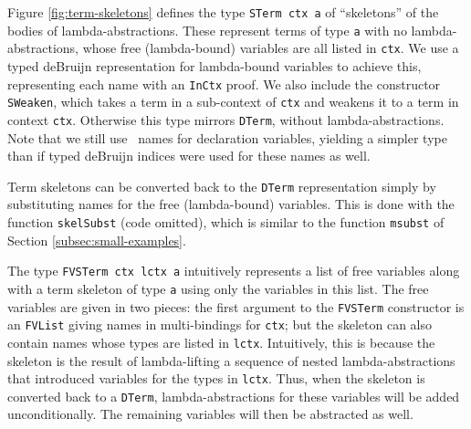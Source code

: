 \documentclass[natbib]{sigplanconf}
\begin{document}


Figure \ref{fig:term-skeletons} defines the type
\lstinline{STerm ctx a} of ``skeletons'' of the bodies of
lambda-abstractions. These represent terms of type \lstinline{a} with
no lambda-abstractions, whose free (lambda-bound) variables are all
listed in \lstinline{ctx}. We use a typed deBruijn representation for
lambda-bound variables to achieve this, representing each name with an
\lstinline{InCtx} proof. We also include the constructor
\lstinline{SWeaken}, which takes a term in a sub-context of
\lstinline{ctx} and weakens it to a term in context \lstinline{ctx}.
Otherwise this type mirrors \lstinline{DTerm}, without
lambda-abstractions. Note that we still use \ourlib\ names for
declaration variables, yielding a simpler type than if typed deBruijn
indices were used for these names as well.


Term skeletons can be converted back to the \lstinline{DTerm}
representation simply by substituting names for the free
(lambda-bound) variables. This is done with the function
\lstinline{skelSubst} (code omitted), which is similar to the function
\lstinline{msubst} of Section \ref{subsec:small-examples}.

The type \lstinline{FVSTerm ctx lctx a} intuitively represents a list
of free variables along with a term skeleton of type \lstinline{a}
using only the variables in this list. The free variables are given in
two pieces: the first argument to the \lstinline{FVSTerm} constructor
is an \lstinline{FVList} giving names in multi-bindings for
\lstinline{ctx}; but the skeleton can also contain names whose types
are listed in \lstinline{lctx}. Intuitively, this is because the
skeleton is the result of lambda-lifting a sequence of nested
lambda-abstractions that introduced variables for the types in
\lstinline{lctx}. Thus, when the skeleton is converted back to a
\lstinline{DTerm}, lambda-abstractions for these variables will be
added unconditionally. The remaining variables will then be abstracted
as well.
\end{document}
